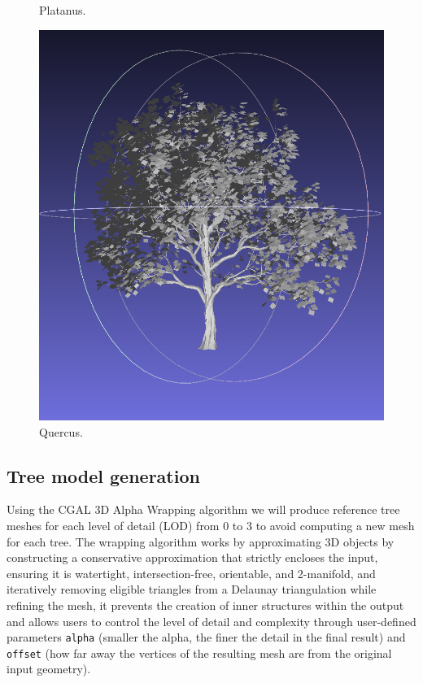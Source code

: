 \documentclass[12pt]{article}
\begin{document}
\begin{figure}[H]
\begin{minipage}{0.24\textwidth}
        \caption{Platanus.}
    \end{minipage}\hfill
    \begin{minipage}{0.24\textwidth}
        \centering
        \includegraphics[width=\textwidth]{images/quercus.png}
        \caption{Quercus.}
    \end{minipage}
\end{figure}

\subsection{Tree model generation}
Using the CGAL 3D Alpha Wrapping \cite{cgal_alpha_wrapper} algorithm we will produce
reference tree meshes for each level of detail (LOD) from 0 to 3 to avoid computing
a new mesh for each tree.
The wrapping algorithm  works by
approximating 3D objects by constructing a
conservative approximation that strictly encloses the input, ensuring it is watertight, 
intersection-free, orientable, and 2-manifold, and iteratively removing eligible 
triangles from a Delaunay triangulation while refining the mesh, it prevents 
the creation of inner structures within the output and allows users to control 
the level of detail and complexity through user-defined parameters \texttt{alpha} 
(smaller the alpha, the finer the detail in the final result) and \texttt{offset} 
(how far away the vertices of the resulting mesh are from the original input geometry).
\end{document}
